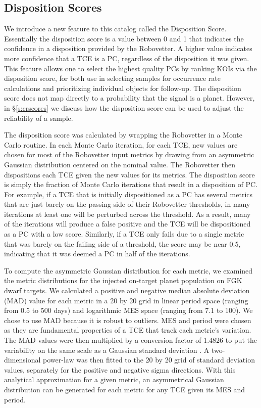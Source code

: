 

\subsection{Disposition Scores}
\label{s:scores}
We introduce a new feature to this catalog called the Disposition Score. Essentially the disposition score is a value between 0 and 1 that indicates the confidence in a disposition provided by the Robovetter. A higher value indicates more confidence that a TCE is a PC, regardless of the disposition it was given. This feature allows one to select the highest quality PCs by ranking KOIs via the disposition score, for both use in selecting samples for occurrence rate calculations and prioritizing individual objects for follow-up. The disposition score does not map directly to a probability that the signal is a planet. However, in \S\ref{s:crscores} we discuss how the disposition score can be used to adjust the reliability of a sample.

The disposition score was calculated by wrapping the Robovetter in a Monte Carlo routine. In each Monte Carlo iteration, for each TCE, new values are chosen for most of the Robovetter input metrics by drawing from an asymmetric Gaussian distribution centered on the nominal value. The Robovetter then dispositions each TCE given the new values for its metrics. The disposition score is simply the fraction of Monte Carlo iterations that result in a disposition of PC. For example, if a TCE that is initially dispositioned as a PC has several metrics that are just barely on the passing side of their Robovetter thresholds, in many iterations at least one will be perturbed across the threshold. As a result, many of the iterations will produce a false positive and the TCE will be dispositioned as a PC with a low score.  Similarly, if a TCE only fails due to a single metric that was barely on the failing side of a threshold, the score may be near 0.5, indicating that it was deemed a PC in half of the iterations.

To compute the asymmetric Gaussian distribution for each metric, we examined the metric distributions for the injected on-target planet population on FGK dwarf targets. We calculated a positive and negative median absolute deviation (MAD) value for each metric in a 20 by 20 grid in linear period space (ranging from 0.5 to 500 days) and logarithmic MES space (ranging from 7.1 to 100). We chose to use MAD because it is robust to outliers. MES and period were chosen as they are fundamental properties of a TCE that track each metric's variation. The MAD values were then multiplied by a conversion factor of 1.4826 to put the variability on the same scale as a Gaussian standard deviation \citep{Hampel1974,Ruppert2010}. A two-dimensional power-law was then fitted to the 20 by 20 grid of standard deviation values, separately for the positive and negative sigma directions. With this analytical approximation for a given metric, an asymmetrical Gaussian distribution can be generated for each metric for any TCE given its MES and period.

